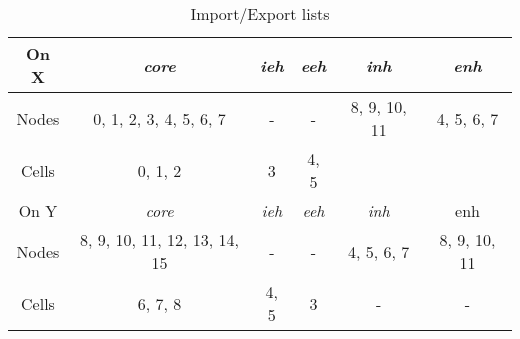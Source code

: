 \documentclass[11pt]{article}
\begin{document}
\begin{table}[t]
\centering\vspace{-10pt}
\caption{Import/Export lists}\small
\begin{tabular}{|c|c|c|c|c|c|} \hline
On X 	& \textit{core}	& \textit{ieh}	& \textit{eeh} 	& \textit{inh}	&
\textit{enh} 	\\\hline
Nodes	& 0, 1, 2, 3, 4, 5, 6, 7	& -	& -	& 8, 9, 10, 11	& 4, 5,
6, 7	\\\hline
Cells	& 0, 1, 2			& 3	& 4, 5	&	&\\\hline\hline
On Y 	& \textit{core}	& \textit{ieh}	& \textit{eeh}	& \textit{inh} & enh
\\\hline
Nodes	& 8, 9, 10, 11, 12, 13, 14, 15	& -	& -	& 4, 5, 6, 7	& 8, 9,
10, 11 	\\\hline
Cells	& 6, 7, 8	& 4, 5	& 3	& -		& - \\\hline
\end{tabular}\label{tab/impexp}\vspace{-0pt}
\end{table}\normalsize
\end{document}

